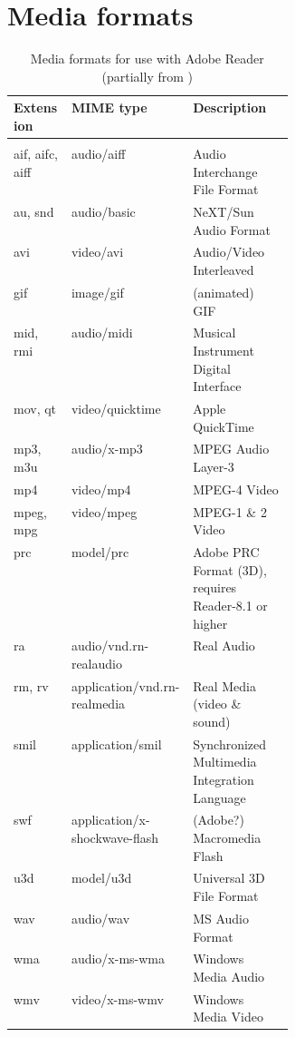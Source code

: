 \documentclass[a4paper]{article}
\begin{document}
\section{Media formats}
\begin{table}[H]
\caption{Media formats for use with Adobe Reader (partially from \cite{pdfspec})}\label{table:mime}
\RaggedRight
\begin{tabular}[t]{llp{0.36\linewidth}}\hline
Extension & MIME type & Description\\\hline\hline\\[-2.5ex]
aif, aifc, aiff & audio/aiff & Audio Interchange File Format\\
au, snd         & audio/basic & NeXT/Sun Audio Format\\
avi             & video/avi & Audio/Video Interleaved\\
gif             & image/gif & (animated) GIF\\
mid, rmi        & audio/midi & Musical Instrument Digital Interface\\
mov, qt         & video/quicktime & Apple QuickTime\\
mp3, m3u        & audio/x-mp3 & MPEG Audio Layer-3\\
mp4             & video/mp4 & MPEG-4 Video\\
mpeg, mpg       & video/mpeg & MPEG-1 \& 2 Video\\
prc             & model/prc  & Adobe PRC Format (3D), requires Reader-8.1 or higher\\
ra              & audio/vnd.rn-realaudio & Real Audio\\
rm, rv          & application/vnd.rn-realmedia & Real Media (video \& sound)\\
smil            & application/smil & Synchronized Multimedia Integration Language\\
swf             & application/x-shockwave-flash & (Adobe?) Macromedia Flash\\
u3d             & model/u3d  & Universal 3D File Format\\
wav             & audio/wav  & MS Audio Format\\
wma             & audio/x-ms-wma & Windows Media Audio\\
wmv             & video/x-ms-wmv & Windows Media Video\\\hline
\end{tabular}
\end{table}
\end{document}
